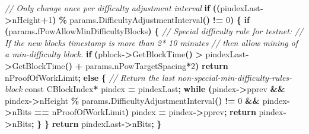 \documentclass[
]{article}
\newenvironment{Shaded}{\begin{snugshade}}{\end{snugshade}}
\newcommand{\AttributeTok}[1]{\textcolor[rgb]{0.13,0.29,0.53}{#1}}
\newcommand{\CommentTok}[1]{\textcolor[rgb]{0.56,0.35,0.01}{\textit{#1}}}
\newcommand{\ControlFlowTok}[1]{\textcolor[rgb]{0.13,0.29,0.53}{\textbf{#1}}}
\newcommand{\DecValTok}[1]{\textcolor[rgb]{0.00,0.00,0.81}{#1}}
\newcommand{\NormalTok}[1]{#1}
\newcommand{\OperatorTok}[1]{\textcolor[rgb]{0.81,0.36,0.00}{\textbf{#1}}}
\begin{document}
\begin{Shaded}
\begin{Highlighting}[numbers=left,,]
    \CommentTok{// Only change once per difficulty adjustment interval}
    \ControlFlowTok{if} \OperatorTok{((}\NormalTok{pindexLast}\OperatorTok{{-}\textgreater{}}\NormalTok{nHeight}\OperatorTok{+}\DecValTok{1}\OperatorTok{)} \OperatorTok{\%}\NormalTok{ params}\OperatorTok{.}\NormalTok{DifficultyAdjustmentInterval}\OperatorTok{()} \OperatorTok{!=} \DecValTok{0}\OperatorTok{)}
    \OperatorTok{\{}
        \ControlFlowTok{if} \OperatorTok{(}\NormalTok{params}\OperatorTok{.}\NormalTok{fPowAllowMinDifficultyBlocks}\OperatorTok{)}
        \OperatorTok{\{}
            \CommentTok{// Special difficulty rule for testnet:}
            \CommentTok{// If the new block\textquotesingle{}s timestamp is more than 2* 10 minutes}
            \CommentTok{// then allow mining of a min{-}difficulty block.}
            \ControlFlowTok{if} \OperatorTok{(}\NormalTok{pblock}\OperatorTok{{-}\textgreater{}}\NormalTok{GetBlockTime}\OperatorTok{()} \OperatorTok{\textgreater{}}\NormalTok{ pindexLast}\OperatorTok{{-}\textgreater{}}\NormalTok{GetBlockTime}\OperatorTok{()} \OperatorTok{+}\NormalTok{ params}\OperatorTok{.}\NormalTok{nPowTargetSpacing}\OperatorTok{*}\DecValTok{2}\OperatorTok{)}
                \ControlFlowTok{return}\NormalTok{ nProofOfWorkLimit}\OperatorTok{;}
            \ControlFlowTok{else}
            \OperatorTok{\{}
                \CommentTok{// Return the last non{-}special{-}min{-}difficulty{-}rules{-}block}
                \AttributeTok{const}\NormalTok{ CBlockIndex}\OperatorTok{*}\NormalTok{ pindex }\OperatorTok{=}\NormalTok{ pindexLast}\OperatorTok{;}
                \ControlFlowTok{while} \OperatorTok{(}\NormalTok{pindex}\OperatorTok{{-}\textgreater{}}\NormalTok{pprev }\OperatorTok{\&\&}\NormalTok{ pindex}\OperatorTok{{-}\textgreater{}}\NormalTok{nHeight }\OperatorTok{\%}\NormalTok{ params}\OperatorTok{.}\NormalTok{DifficultyAdjustmentInterval}\OperatorTok{()} 
                  \OperatorTok{!=} \DecValTok{0} \OperatorTok{\&\&}\NormalTok{ pindex}\OperatorTok{{-}\textgreater{}}\NormalTok{nBits }\OperatorTok{==}\NormalTok{ nProofOfWorkLimit}\OperatorTok{)}
\NormalTok{                    pindex }\OperatorTok{=}\NormalTok{ pindex}\OperatorTok{{-}\textgreater{}}\NormalTok{pprev}\OperatorTok{;}
                \ControlFlowTok{return}\NormalTok{ pindex}\OperatorTok{{-}\textgreater{}}\NormalTok{nBits}\OperatorTok{;}
            \OperatorTok{\}}
        \OperatorTok{\}}
        \ControlFlowTok{return}\NormalTok{ pindexLast}\OperatorTok{{-}\textgreater{}}\NormalTok{nBits}\OperatorTok{;}
    \OperatorTok{\}}


\end{Highlighting}
\end{Shaded}
\end{document}
